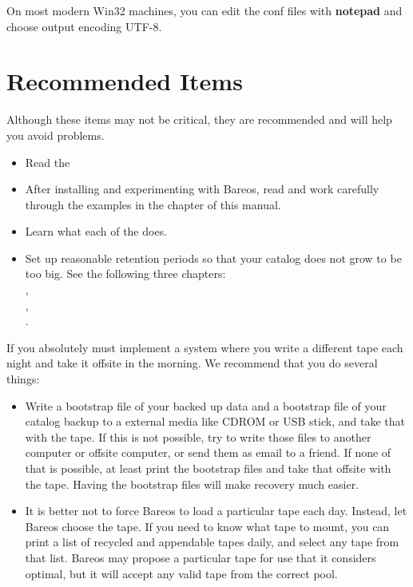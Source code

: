 \begin{itemize}
   On most modern Win32 machines, you can edit the conf files with {\bf
   notepad} and choose output encoding UTF-8.
\end{itemize}

\section{Recommended Items}

Although these items may not be critical, they are recommended and will help
you avoid problems.

\begin{itemize}
\item Read the 
\item After installing and experimenting with Bareos, read and work carefully
   through the examples in the
    chapter  of this manual.
\item Learn what each of the 
   does.
\item Set up reasonable retention periods so that your catalog does not  grow
   to be too big. See the following three chapters:\\
   ,\\
   ,\\
   .
\end{itemize}

If you absolutely must implement a system where you write a different
tape each night and take it offsite in the morning. We recommend that you do
several things:
\begin{itemize}
\item Write a bootstrap file of your backed up data and a bootstrap file
   of your catalog backup to a external media like CDROM or USB stick, and take that with
   the tape.  If this is not possible, try to write those files to another
   computer or offsite computer, or send them as email to a friend. If none
   of that is possible, at least print the bootstrap files and take that
   offsite with the tape.  Having the bootstrap files will make recovery
   much easier.
\item It is better not to force Bareos to load a particular tape each day.
   Instead, let Bareos choose the tape.  If you need to know what tape to
   mount, you can print a list of recycled and appendable tapes daily, and
   select any tape from that list.  Bareos may propose a particular tape
   for use that it considers optimal, but it will accept any valid tape
   from the correct pool.
\end{itemize}
